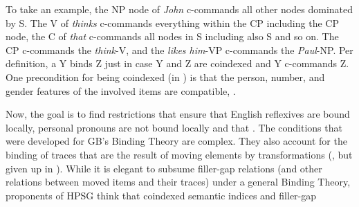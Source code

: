 \documentclass[output=paper
 	        ,biblatex
                ,babelshorthands
                ,newtxmath
                ,draftmode
                ,colorlinks, citecolor=brown
]{langscibook}
\begin{document}
To take an example, the NP node of \emph{John} c-commands all other nodes dominated by S. The V of
\emph{thinks} c-commands everything within the CP including the CP node, the C of \emph{that}
c-commands all nodes in S including also S and so on. The CP c-commands the \emph{think}-V, and the
\emph{likes him}-VP c-commands the \emph{Paul}-NP. Per definition, a Y binds Z just in case Y and Z
are coindexed and Y c-commands Z. One precondition for being coindexed (in ) is that the
person, number, and gender features of the involved items are compatible, . 

Now, the goal is to find restrictions that ensure that English reflexives are bound locally, personal
pronouns are not bound locally and that .
 The conditions that were developed for
GB's Binding Theory are complex. They also account for the binding of traces that are the result of
moving elements by transformations (\citealp{Chomsky81a}, but given up in
\citealp{Chomsky86a}).\label{page-traces-binding} While it is elegant to subsume filler-gap relations (and other relations
between moved items and their traces) under a general Binding Theory, proponents of HPSG think that
coindexed semantic indices and filler-gap
\end{document}
